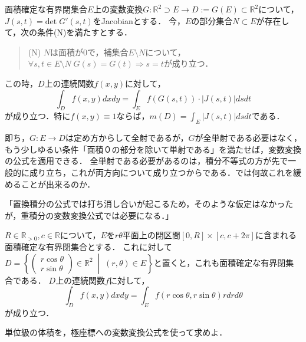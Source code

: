\documentclass[uplatex, dvipdfmx]{jsreport}
\begin{document}
\begin{shadebox}\begin{theorem}
    面積確定な有界閉集合$E$上の変数変換$G:\mathbb{R}^2\supset E\to D:=G(E)\subset\mathbb{R}^2$について，$J(s,t)=\mathrm{det}\;G'(s,t)$をJacobianとする．
    今，$E$の部分集合$N\subset E$が存在して，次の条件(N)を満たすとする．
    \begin{quote}
        (N) $N$は面積が$0$で，補集合$E\setminus N$について，$\forall s,t\in E\setminus N\; G(s)=G(t)\Rightarrow s=t$が成り立つ．
    \end{quote}
    この時，$D$上の連続関数$f(x,y)$に対して，
    \[ \int_Df(x,y)dxdy = \int_Ef(G(s,t))\cdot |J(s,t)|dsdt \]
    が成り立つ．特に$f(x,y)\equiv 1$ならば，$m(D)=\int_E|J(s,t)|dsdt$である．
\end{theorem}\end{shadebox}
\begin{remark*}
    即ち，$G:E\to D$は定め方からして全射であるが，$G$が全単射である必要はなく，もう少しゆるい条件「面積０の部分を除いて単射である」を満たせば，変数変換の公式を適用できる．
    全単射である必要があるのは，積分不等式の方が先で一般的に成り立ち，これが両方向について成り立つからである．では何故これを緩めることが出来るのか．

    「置換積分の公式では打ち消し合いが起こるため，そのような仮定はなかったが，重積分の変数変換公式では必要になる．」
\end{remark*}

\begin{example}[極座標への変数変換公式]
    $R\in\mathbb{R}_{>0},c\in\mathbb{R}$について，$E$を$r\theta$平面上の閉区間$[0,R]\times [c,c+2\pi]$に含まれる面積確定な有界閉集合とする．
    これに対して$D=\left\{ \left(\begin{array}{c}r\cos\theta \\ r\sin\theta\end{array}\right)\in\mathbb{R}^2\;\middle|\; (r,\theta)\in E \right\}$と置くと，これも面積確定な有界閉集合である．
    $D$上の連続関数$f$に対して，
    \[ \int_Df(x,y)dxdy = \int_Ef(r\cos\theta,r\sin\theta)rdrd\theta \]
    が成り立つ．
\end{example}
\begin{reidai}
    単位級の体積を，極座標への変数変換公式を使って求めよ．
\end{reidai}
\end{document}
